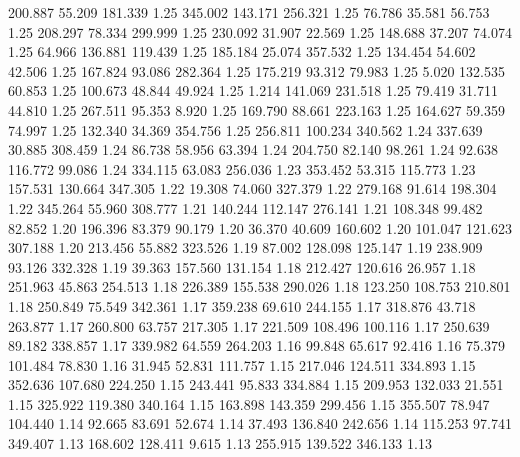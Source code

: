  200.887   55.209  181.339         1.25
 345.002  143.171  256.321         1.25
  76.786   35.581   56.753         1.25
 208.297   78.334  299.999         1.25
 230.092   31.907   22.569         1.25
 148.688   37.207   74.074         1.25
  64.966  136.881  119.439         1.25
 185.184   25.074  357.532         1.25
 134.454   54.602   42.506         1.25
 167.824   93.086  282.364         1.25
 175.219   93.312   79.983         1.25
   5.020  132.535   60.853         1.25
 100.673   48.844   49.924         1.25
   1.214  141.069  231.518         1.25
  79.419   31.711   44.810         1.25
 267.511   95.353    8.920         1.25
 169.790   88.661  223.163         1.25
 164.627   59.359   74.997         1.25
 132.340   34.369  354.756         1.25
 256.811  100.234  340.562         1.24
 337.639   30.885  308.459         1.24
  86.738   58.956   63.394         1.24
 204.750   82.140   98.261         1.24
  92.638  116.772   99.086         1.24
 334.115   63.083  256.036         1.23
 353.452   53.315  115.773         1.23
 157.531  130.664  347.305         1.22
  19.308   74.060  327.379         1.22
 279.168   91.614  198.304         1.22
 345.264   55.960  308.777         1.21
 140.244  112.147  276.141         1.21
 108.348   99.482   82.852         1.20
 196.396   83.379   90.179         1.20
  36.370   40.609  160.602         1.20
 101.047  121.623  307.188         1.20
 213.456   55.882  323.526         1.19
  87.002  128.098  125.147         1.19
 238.909   93.126  332.328         1.19
  39.363  157.560  131.154         1.18
 212.427  120.616   26.957         1.18
 251.963   45.863  254.513         1.18
 226.389  155.538  290.026         1.18
 123.250  108.753  210.801         1.18
 250.849   75.549  342.361         1.17
 359.238   69.610  244.155         1.17
 318.876   43.718  263.877         1.17
 260.800   63.757  217.305         1.17
 221.509  108.496  100.116         1.17
 250.639   89.182  338.857         1.17
 339.982   64.559  264.203         1.16
  99.848   65.617   92.416         1.16
  75.379  101.484   78.830         1.16
  31.945   52.831  111.757         1.15
 217.046  124.511  334.893         1.15
 352.636  107.680  224.250         1.15
 243.441   95.833  334.884         1.15
 209.953  132.033   21.551         1.15
 325.922  119.380  340.164         1.15
 163.898  143.359  299.456         1.15
 355.507   78.947  104.440         1.14
  92.665   83.691   52.674         1.14
  37.493  136.840  242.656         1.14
 115.253   97.741  349.407         1.13
 168.602  128.411    9.615         1.13
 255.915  139.522  346.133         1.13
